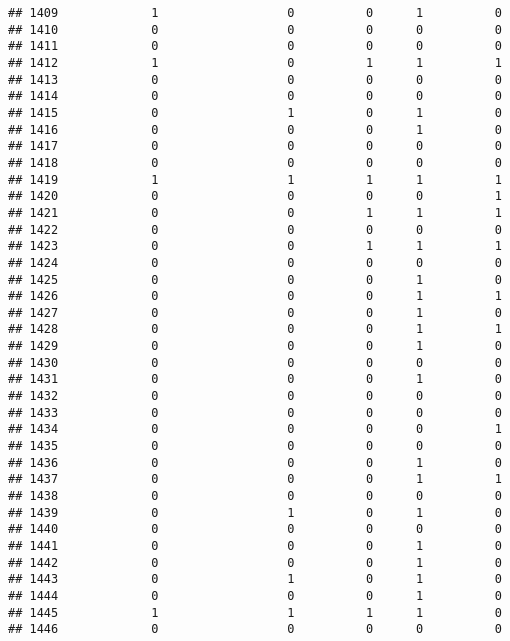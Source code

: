\documentclass[
]{article}
\begin{document}
\begin{verbatim}
## 1409             1                  0          0      1          0
## 1410             0                  0          0      0          0
## 1411             0                  0          0      0          0
## 1412             1                  0          1      1          1
## 1413             0                  0          0      0          0
## 1414             0                  0          0      0          0
## 1415             0                  1          0      1          0
## 1416             0                  0          0      1          0
## 1417             0                  0          0      0          0
## 1418             0                  0          0      0          0
## 1419             1                  1          1      1          1
## 1420             0                  0          0      0          1
## 1421             0                  0          1      1          1
## 1422             0                  0          0      0          0
## 1423             0                  0          1      1          1
## 1424             0                  0          0      0          0
## 1425             0                  0          0      1          0
## 1426             0                  0          0      1          1
## 1427             0                  0          0      1          0
## 1428             0                  0          0      1          1
## 1429             0                  0          0      1          0
## 1430             0                  0          0      0          0
## 1431             0                  0          0      1          0
## 1432             0                  0          0      0          0
## 1433             0                  0          0      0          0
## 1434             0                  0          0      0          1
## 1435             0                  0          0      0          0
## 1436             0                  0          0      1          0
## 1437             0                  0          0      1          1
## 1438             0                  0          0      0          0
## 1439             0                  1          0      1          0
## 1440             0                  0          0      0          0
## 1441             0                  0          0      1          0
## 1442             0                  0          0      1          0
## 1443             0                  1          0      1          0
## 1444             0                  0          0      1          0
## 1445             1                  1          1      1          0
## 1446             0                  0          0      0          0

\end{verbatim}
\end{document}
